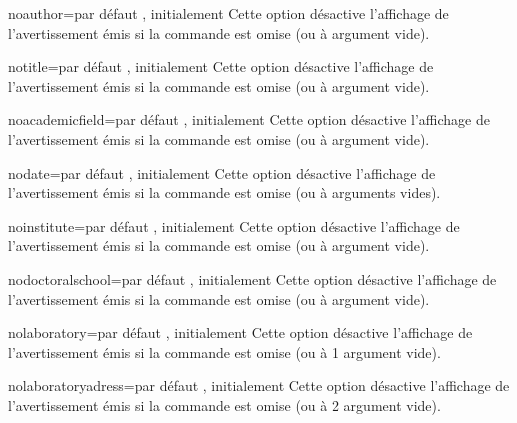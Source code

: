 \begin{docKey}{noauthor}{=\textbar{}}{par défaut ,
    initialement }
  Cette option désactive l'affichage de l'avertissement émis si la commande
   est omise (ou à argument vide).
\end{docKey}
\begin{docKey}{notitle}{=\textbar{}}{par défaut ,
    initialement }
  Cette option désactive l'affichage de l'avertissement émis si la commande
   est omise (ou à argument vide).
\end{docKey}
\begin{docKey}{noacademicfield}{=\textbar{}}{par défaut ,
    initialement }
  Cette option désactive l'affichage de l'avertissement émis si la commande
   est omise (ou à argument vide).
\end{docKey}
\begin{docKey}{nodate}{=\textbar{}}{par défaut ,
    initialement }
  Cette option désactive l'affichage de l'avertissement émis si la commande
   est omise (ou à arguments vides).
\end{docKey}
\begin{docKey}{noinstitute}{=\textbar{}}{par défaut ,
    initialement }
  Cette option désactive l'affichage de l'avertissement émis si la commande
   est omise (ou à argument vide).
\end{docKey}
\begin{docKey}{nodoctoralschool}{=\textbar{}}{par défaut ,
    initialement }
  Cette option désactive l'affichage de l'avertissement émis si la commande
   est omise (ou à argument vide).
\end{docKey}
\begin{docKey}{nolaboratory}{=\textbar{}}{par défaut ,
    initialement }
  Cette option désactive l'affichage de l'avertissement émis si la commande
   est omise (ou à 1\ier{} argument vide).
\end{docKey}
\begin{docKey}{nolaboratoryadress}{=\textbar{}}{par défaut ,
    initialement }
  Cette option désactive l'affichage de l'avertissement émis si la commande
   est omise (ou à 2\ieme{} argument vide).
\end{docKey}
